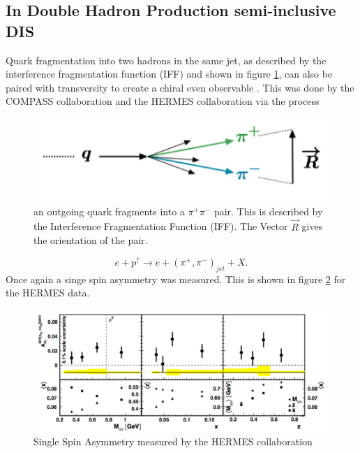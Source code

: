 \documentclass[abstract = on,listof=totoc, bibliography=totoc]{scrreprt}
\begin{document}
\subsection{In Double Hadron Production semi-inclusive DIS}
\label{subSec:doublehadProd}
Quark fragmentation into two hadrons in the same jet, as described by the interference fragmentation function (IFF) and shown in figure \ref{fig:IFF}, can also be paired with transversity to create a chiral even observable \cite{EFREMOV1992394, Bianconi:1999cd}. This was done by the COMPASS collaboration \cite{compassRes} and the HERMES collaboration \cite{hermesRes} via the process
\begin{figure}
\begin{center}
\includegraphics[width = .7\textwidth]{IFFwrite}
\caption[Interference Fragmentation Function]{an outgoing quark fragments into a $\pi^+\pi^-$ pair. This is described by the Interference Fragmentation Function (IFF). The Vector $\vec{R}$ gives the orientation of the pair.}
\label{fig:IFF}
\end{center}
\end{figure}
 \begin{equation}
e+p^\uparrow \rightarrow e + (\pi^+,\pi^-)_{jet} + X.
\end{equation}
Once again a singe spin asymmetry was measured. This is shown in figure \ref{fig:hermesAsym} for the HERMES data.
 \begin{figure}
\begin{center}
\includegraphics[width = 1\textwidth]{hermesAsym}
\caption[Single Spin Asymmetry measured by the HERMES collaboration]{Single Spin Asymmetry measured by the HERMES collaboration \cite{hermesRes}}
\label{fig:hermesAsym}
\end{center}
\end{figure}
\end{document}
